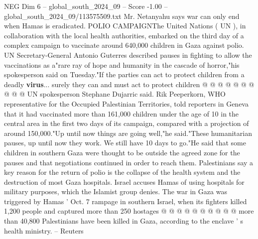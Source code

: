 \begin{textsample}{NEG Dim 6 – global\_south\_2024\_09 – Score -1.00 – global\_south\_2024\_09/113575509.txt}
Mr.
Netanyahu says war can only end when Hamas is eradicated.
POLIO CAMPAIGNThe United Nations ( UN ), in collaboration with the local health authorities, embarked on the third day of a complex campaign to vaccinate around 640,000 children in Gaza against polio.
UN Secretary-General Antonio Guterres described pauses in fighting to allow the vaccinations as a"rare ray of hope and humanity in the cascade of horror,"his spokesperson said on Tuesday."If the parties can act to protect children from a deadly \textbf{virus}... surely they can and must act to protect children @ @ @ @ @ @ @ @ @ @ UN spokesperson Stephane Dujarric said.
Rik Peeperkorn, WHO representative for the Occupied Palestinian Territories, told reporters in Geneva that it had vaccinated more than 161,000 children under the age of 10 in the central area in the first two days of its campaign, compared with a projection of around 150,000."Up until now things are going well,"he said."These humanitarian pauses, up until now they work.
We still have 10 days to go."He said that some children in southern Gaza were thought to be outside the agreed zone for the pauses and that negotiations continued in order to reach them.
Palestinians say a key reason for the return of polio is the collapse of the health system and the destruction of most Gaza hospitals.
Israel accuses Hamas of using hospitals for military purposes, which the Islamist group denies.
The war in Gaza was triggered by Hamas ' Oct. 7 rampage in southern Israel, when its fighters killed 1,200 people and captured more than 250 hostages @ @ @ @ @ @ @ @ @ @ more than 40,800 Palestinians have been killed in Gaza, according to the enclave ' s health ministry. -- Reuters

\end{textsample}
